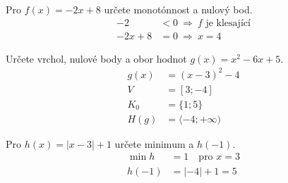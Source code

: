 \documentclass[11pt,a4paper]{article}
\begin{document}
\begin{zadaniReseniBox}[title={Samostatná práce 1}]
Pro $f(x)=-2x+8$ určete monotónnost a nulový bod.
\tcblower
\[
\begin{aligned}
-2&<0\ \Rightarrow\ f\text{ je klesající}\\
-2x+8&=0\ \Rightarrow\ x=4
\end{aligned}
\]

\end{zadaniReseniBox}
\begin{zadaniReseniBox}[title={Samostatná práce 2}]
Určete vrchol, nulové body a obor hodnot $g(x)=x^2-6x+5$.
\tcblower
\[
\begin{aligned}
g(x)&=(x-3)^2-4\\
V&=[3;-4]\\
K_0&=\{1;5\}\\
H(g)&=\langle-4;+\infty)
\end{aligned}
\]

\end{zadaniReseniBox}
\begin{zadaniReseniBox}[title={Samostatná práce 3}]
Pro $h(x)=|x-3|+1$ určete minimum a $h(-1)$.
\tcblower
\[
\begin{aligned}
\min h&=1\quad\text{pro }x=3\\
h(-1)&=|-4|+1=5
\end{aligned}
\]

\end{zadaniReseniBox}
\end{document}
